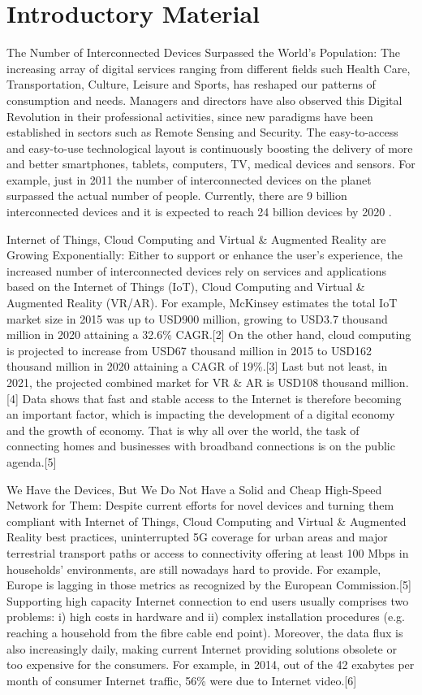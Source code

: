 \chapter{Introductory Material}
\label{chapterlabel1}

The Number of Interconnected Devices Surpassed the World’s Population: The increasing array of digital services ranging from different fields such Health Care, Transportation, Culture, Leisure and Sports, has reshaped our patterns of consumption and needs. Managers and directors have also observed this Digital Revolution in their professional activities, since new paradigms have been established in sectors such as Remote Sensing and Security. The easy-to-access and easy-to-use technological layout is continuously boosting the delivery of more and better smartphones, tablets, computers, TV, medical devices and sensors. For example, just in 2011 the number of interconnected devices on the planet surpassed the actual number of people. Currently, there are 9 billion interconnected devices and it is expected to reach 24 billion devices by 2020 \cite{RePEc:eee:bushor:v:58:y:2015:i:4:p:431-440}.

Internet of Things, Cloud Computing and Virtual \& Augmented Reality are Growing Exponentially: Either to support or enhance the user’s experience, the increased number of interconnected devices rely on services and applications based on the Internet of Things (IoT), Cloud Computing and Virtual \& Augmented Reality (VR/AR). For example, McKinsey estimates the total IoT market size in 2015 was up to USD900 million, growing to USD3.7 thousand million in 2020 attaining a 32.6\% CAGR.[2] On the other hand, cloud computing is projected to increase from USD67 thousand million in 2015 to USD162 thousand million in 2020 attaining a CAGR of 19\%.[3] Last but not least, in 2021, the projected combined market for VR \& AR is USD108 thousand million.[4] Data shows that fast and stable access to the Internet is therefore becoming an important factor, which is impacting the development of a digital economy and the growth of economy. That is why all over the world, the task of connecting homes and businesses with broadband connections is on the public agenda.[5]

We Have the Devices, But We Do Not Have a Solid and Cheap High-Speed Network for Them: Despite current efforts for novel devices and turning them compliant with Internet of Things, Cloud Computing and Virtual \& Augmented Reality best practices, uninterrupted 5G coverage for urban areas and major terrestrial transport paths or access to connectivity offering at least 100 Mbps in households’ environments, are still nowadays hard to provide. For example, Europe is lagging in those metrics as recognized by the European Commission.[5] Supporting high capacity Internet connection to end users usually comprises two problems: i) high costs in hardware and ii) complex installation procedures (e.g. reaching a household from the fibre cable end point). Moreover, the data flux is also increasingly daily, making current Internet providing solutions obsolete or too expensive for the consumers. For example, in 2014, out of the 42 exabytes per month of consumer Internet traffic, 56\% were due to Internet video.[6]

